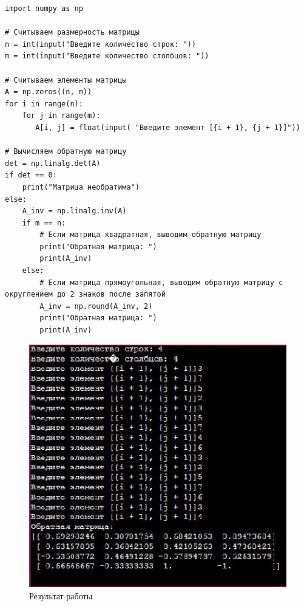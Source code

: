 \documentclass[12pt,a4paper]{scrartcl}
\begin{document}
\begin{verbatim}
import numpy as np

# Считываем размерность матрицы
n = int(input("Введите количество строк: "))
m = int(input("Введите количество столбцов: "))

# Считываем элементы матрицы
A = np.zeros((n, m))
for i in range(n):
    for j in range(m):
       A[i, j] = float(input( "Введите элемент [{i + 1}, {j + 1}]"))

# Вычисляем обратную матрицу
det = np.linalg.det(A)
if det == 0:
    print("Матрица необратима")
else:
    A_inv = np.linalg.inv(A)
    if m == n:
        # Если матрица квадратная, выводим обратную матрицу
        print("Обратная матрица: ")
        print(A_inv)
    else:
        # Если матрица прямоугольная, выводим обратную матрицу с округлением до 2 знаков после запятой
        A_inv = np.round(A_inv, 2)
        print("Обратная матрица: ")
        print(A_inv)
\end{verbatim}

\begin{figure}[h]
 \centering
 \includegraphics[width=1\textwidth]{photo1686082293.jpeg}
 \caption{Результат работы}\label{fig:par}
\end{figure}
\end{document}
